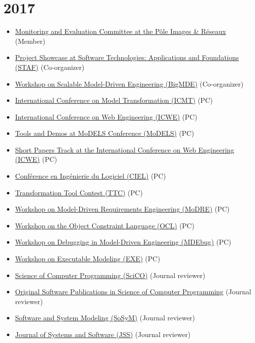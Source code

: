 \hypertarget{section-6}{%
\section{2017}\label{section-6}}

\begin{itemize}
\tightlist
\item
  \href{http://www.images-et-reseaux.com/en}{Monitoring and Evaluation
  Committee at the Pôle Images \& Réseaux} (Member)
\item
  \href{http://www.informatik.uni-marburg.de/staf2017/index.php/projects-showcases/}{Project
  Showcase at Software Technologies: Applications and Foundations
  (STAF)} (Co-organizer)
\item
  \href{http://www.big-mde.eu/}{Workshop on Scalable Model-Driven
  Engineering (BigMDE)} (Co-organizer)
\item
  \href{http://www.model-transformation.org/}{International Conference
  on Model Transformation (ICMT)} (PC)
\item
  \href{http://icwe2017.webengineering.org/}{International Conference on
  Web Engineering (ICWE)} (PC)
\item
  \href{http://www.cs.colostate.edu/~ghosh/models17_td/home_models17_td.html}{Tools
  and Demos at MoDELS Conference (MoDELS)} (PC)
\item
  \href{http://icwe2017.webengineering.org/}{Short Papers Track at the
  International Conference on Web Engineering (ICWE)} (PC)
\item
  \href{https://ciel2016.sciencesconf.org/}{Conférence en Ingénierie du
  Logiciel (CIEL)} (PC)
\item
  \href{http://www.transformation-tool-contest.eu/}{Transformation Tool
  Contest (TTC)} (PC)
\item
  \href{http://www.modre2017.ece.mcgill.ca/}{Workshop on Model-Driven
  Requirements Engineering (MoDRE)} (PC)
\item
  \href{http://oclworkshop.github.io/2017/}{Workshop on the Object
  Constraint Language (OCL)} (PC)
\item
  \href{https://msdl.uantwerpen.be/conferences/MDEbug/}{Workshop on
  Debugging in Model-Driven Engineering (MDEbug)} (PC)
\item
  \href{http://www.modelexecution.org/?page_id=1820}{Workshop on
  Executable Modeling (EXE)} (PC)
\item
  \href{http://www.journals.elsevier.com/science-of-computer-programming/}{Science
  of Computer Programming (SciCO)} (Journal reviewer)
\item
  \href{https://www.journals.elsevier.com/science-of-computer-programming/call-for-software/a-new-software-track-on-original-software-publications-scico/}{Original
  Software Publications in Science of Computer Programming} (Journal
  reviewer)
\item
  \href{http://www.sosym.org/}{Software and System Modeling (SoSyM)}
  (Journal reviewer)
\item
  \href{http://www.journals.elsevier.com/journal-of-systems-and-software}{Journal
  of Systems and Software (JSS)} (Journal reviewer)
\end{itemize}

